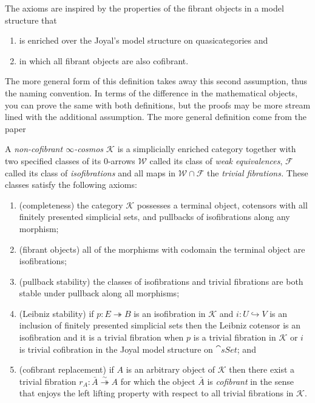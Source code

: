 The axioms are inspired by the properties of the fibrant objects in a model structure that
\begin{enumerate}
    \item is enriched over the Joyal's model structure on quasicategories and
    \item in which all fibrant objects are also cofibrant.
\end{enumerate}
 The more general form of this definition takes away this second assumption, thus the naming convention. In terms of the difference in the mathematical objects, you can prove the same with both definitions, but the proofs may be more stream lined with the additional assumption.
The more general definition come from the paper \cite{rvp} 

\begin{defn}
     A \emph{non-cofibrant $\infty$-cosmos $\mathcal{K}$} is a simplicially enriched category together with two specified classes of its $0$-arrows $\mathcal{W}$ called its class of \textit{weak equivalences}, $\mathcal{F}$ called its class of \textit{isofibrations} and all maps in $\mathcal{W} \cap \mathcal{F}$ the \textit{trivial fibrations.} These classes satisfy the following axioms:
     \begin{enumerate}
        \item (completeness) the category $\mathcal{K}$ possesses a terminal object, cotensors with all finitely presented simplicial sets, and pullbacks of isofibrations along any morphism;
        \item (fibrant objects) all of the morphisms with codomain the terminal object are isofibrations;
        \item (pullback stability) the classes of isofibrations and trivial fibrations are both stable under pullback along all morphisms;
        \item (Leibniz stability) if $p:E\twoheadrightarrow B$ is an isofibration in $\mathcal{K}$ and $i:U\hookrightarrow V$ is an inclusion of finitely presented simplicial sets then the Leibniz cotensor is an isofibration and it is a trivial fibration when $p$ is a trivial fibration in $\mathcal{K}$ or $i$ is trivial cofibration in the Joyal model structure on $\cat{sSet}$; and
        \item (cofibrant replacement) if $A$ is an arbitrary object of $\mathcal{K}$ then there exist a trivial fibration $r_A:\bar{A}\stackrel{\sim}{\twoheadrightarrow} A$ for which the object $\bar{A}$ is \emph{cofibrant} in the sense that enjoys the left lifting property with respect to all trivial fibrations in $\mathcal{K}$.
     \end{enumerate}
\end{defn}
